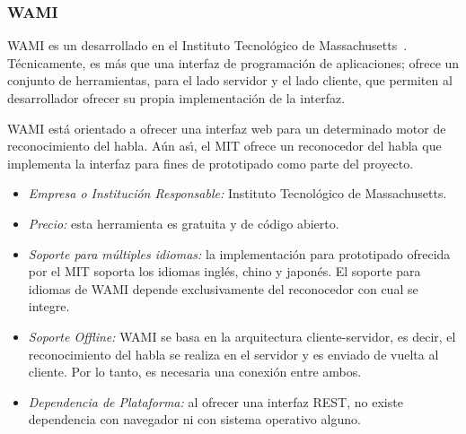 \subsubsection{WAMI}
\label{sec:wami}

WAMI es un  desarrollado en el Instituto Tecnol\'ogico de
\mbox{Massachusetts \cite{WamiHome}}. T\'ecnicamente, es m\'as que una interfaz de programaci\'on
de aplicaciones; ofrece un conjunto de herramientas, para el lado servidor y el lado cliente,
que permiten al desarrollador ofrecer su propia implementaci\'on de la interfaz.

WAMI est\'a orientado a ofrecer una interfaz web para un determinado motor de reconocimiento del habla. 
A\'un as{\'\i}, el MIT ofrece un reconocedor del habla que implementa la interfaz para fines 
de prototipado como parte del proyecto.

\begin{itemize}
	\item \emph{Empresa o Instituci\'on Responsable:} Instituto Tecnol\'ogico de Massachusetts.
	\item \emph{Precio:} esta herramienta es gratuita y de c\'odigo abierto.
	\item \emph{Soporte para m\'ultiples idiomas:} la implementaci\'on para prototipado ofrecida
	por el MIT soporta los idiomas ingl\'es, chino y japon\'es. El soporte para idiomas de WAMI
	depende exclusivamente del reconocedor con cual se integre.
	\item \emph{Soporte Offline:} WAMI se basa en la arquitectura cliente-servidor, es decir, el reconocimiento del habla 
    se realiza en el servidor y es enviado de vuelta al cliente. Por lo tanto, es necesaria una conexi\'on entre ambos.
	\item \emph{Dependencia de Plataforma:} al ofrecer una interfaz REST, no existe dependencia con
	navegador ni con sistema operativo alguno.
\end{itemize}
